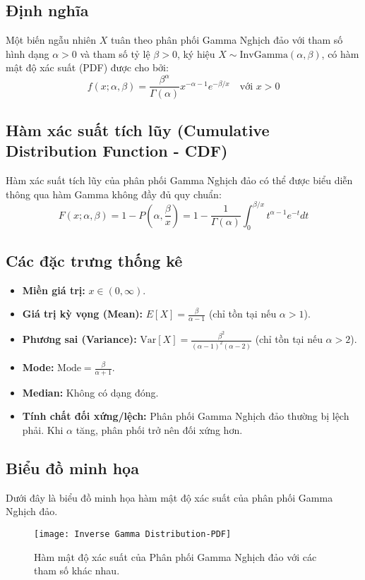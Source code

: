 	\subsection{Định nghĩa}
		Một biến ngẫu nhiên $X$ tuân theo phân phối Gamma Nghịch đảo với tham số hình dạng $\alpha > 0$ và tham số tỷ lệ $\beta > 0$, ký hiệu $X \sim \text{InvGamma}(\alpha, \beta)$, có hàm mật độ xác suất (PDF) được cho bởi:
		\[ f(x; \alpha, \beta) = \frac{\beta^\alpha}{\Gamma(\alpha)} x^{-\alpha-1} e^{-\beta/x} \quad \text{với } x > 0 \]
	
	\subsection{Hàm xác suất tích lũy (Cumulative Distribution Function - CDF)}
	Hàm xác suất tích lũy của phân phối Gamma Nghịch đảo có thể được biểu diễn thông qua hàm Gamma không đầy đủ quy chuẩn:
	\[ F(x; \alpha, \beta) = 1 - P\left(\alpha, \frac{\beta}{x}\right) = 1 - \frac{1}{\Gamma(\alpha)} \int_0^{\beta/x} t^{\alpha-1} e^{-t} dt \]
	
	\subsection{Các đặc trưng thống kê}
	\begin{itemize}[leftmargin=*]
		\item \textbf{Miền giá trị:} $x \in (0, \infty)$.
		\item \textbf{Giá trị kỳ vọng (Mean):} $E[X] = \frac{\beta}{\alpha-1}$ \quad (chỉ tồn tại nếu $\alpha > 1$).
		\item \textbf{Phương sai (Variance):} $\text{Var}[X] = \frac{\beta^2}{(\alpha-1)^2(\alpha-2)}$ \quad (chỉ tồn tại nếu $\alpha > 2$).
		\item \textbf{Mode:} $\text{Mode} = \frac{\beta}{\alpha+1}$.
		\item \textbf{Median:} Không có dạng đóng.
		\item \textbf{Tính chất đối xứng/lệch:} Phân phối Gamma Nghịch đảo thường bị lệch phải. Khi $\alpha$ tăng, phân phối trở nên đối xứng hơn.
	\end{itemize}
	
	\subsection{Biểu đồ minh họa}
	Dưới đây là biểu đồ minh họa hàm mật độ xác suất của phân phối Gamma Nghịch đảo.
	
	\begin{figure}[h!]
		\centering
		\texttt{[image: Inverse Gamma Distribution-PDF]} %
		\caption{Hàm mật độ xác suất của Phân phối Gamma Nghịch đảo với các tham số khác nhau.}
		\label{fig:Inverse Gamma Distribution-PDF}
	\end{figure}
	
